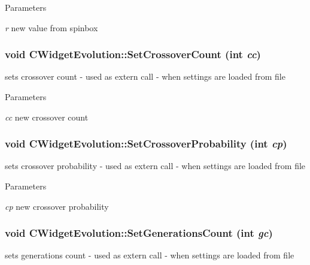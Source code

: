 \begin{DoxyParams}{Parameters}
\item[{\em r}]new value from spinbox \end{DoxyParams}
\hypertarget{classCWidgetEvolution_ad4d552bfa2b441f1f0b8f78343a131e7}{
\subsubsection[{SetCrossoverCount}]{\setlength{\rightskip}{0pt plus 5cm}void CWidgetEvolution::SetCrossoverCount (int {\em cc})}}
\label{classCWidgetEvolution_ad4d552bfa2b441f1f0b8f78343a131e7}
sets crossover count -\/ used as extern call -\/ when settings are loaded from file


\begin{DoxyParams}{Parameters}
\item[{\em cc}]new crossover count \end{DoxyParams}
\hypertarget{classCWidgetEvolution_a57c5a52ca97a082b05e9fa6738453a75}{
\subsubsection[{SetCrossoverProbability}]{\setlength{\rightskip}{0pt plus 5cm}void CWidgetEvolution::SetCrossoverProbability (int {\em cp})}}
\label{classCWidgetEvolution_a57c5a52ca97a082b05e9fa6738453a75}
sets crossover probability -\/ used as extern call -\/ when settings are loaded from file


\begin{DoxyParams}{Parameters}
\item[{\em cp}]new crossover probability \end{DoxyParams}
\hypertarget{classCWidgetEvolution_ac37ef6a70355a7c15b3861a2e4112a96}{
\subsubsection[{SetGenerationsCount}]{\setlength{\rightskip}{0pt plus 5cm}void CWidgetEvolution::SetGenerationsCount (int {\em gc})}}
\label{classCWidgetEvolution_ac37ef6a70355a7c15b3861a2e4112a96}
sets generations count -\/ used as extern call -\/ when settings are loaded from file


